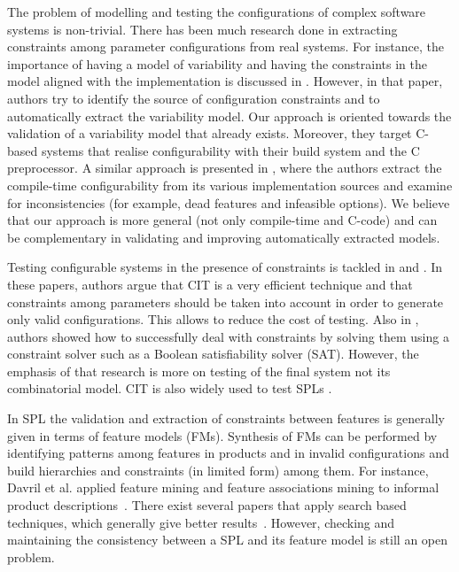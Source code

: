 \begin{tikzborder}{\cite{Gargantini16:validation}}
\begin{tikzborder}{\cite{gargantini_combinatorial_2017}}
The problem of modelling and testing the configurations of complex software systems is non-trivial. There has been much research done in extracting constraints among parameter configurations from real systems. %
For instance, the importance of having a model of variability and having the constraints in the model aligned with the implementation is discussed in \cite{NadiBKC14}. However, in that paper, authors try to identify the source of configuration constraints and to automatically extract the variability model. Our approach is oriented towards the validation of a variability model that already exists. Moreover, they target C-based systems that realise configurability with their build system and the C preprocessor. 
A similar approach is presented in \cite{Tartler:2011}, where the authors extract the compile-time configurability from its various implementation sources and examine for inconsistencies (for example, dead features and infeasible options). We believe that our approach is more general (not only compile-time and C-code) and can be complementary in validating and improving automatically extracted models.

Testing configurable systems in the presence of constraints is tackled in \cite{CohenTSE08} and \cite{Petke15:practical}. In these papers, authors argue that CIT is a very efficient technique and that constraints among parameters should be taken into account in order to generate only valid configurations. This allows to reduce the cost of testing. Also in \cite{jar10}, authors showed how to successfully deal with constraints by solving them using a constraint solver such as a Boolean satisfiability solver (SAT). However, the emphasis of that research is more on testing of the final system not its combinatorial model. CIT is also widely used to test SPLs \cite{Perrouin010a}.

In SPL the validation and extraction of constraints between features is generally given in terms of feature models (FMs). Synthesis of FMs can be performed by identifying patterns among features in products and in invalid configurations and build hierarchies and constraints (in limited form) among them. For instance, Davril et al. applied feature mining and feature associations mining to informal product descriptions~\cite{Davril13}. There exist several papers that apply search based techniques, which generally give better results~\cite{SBSEforSPLsurvey,LopezHerrejon201533,FerreiraVQ13,lopez-herrejon_reverse_2012}. However, checking and maintaining the consistency between a SPL and its feature model is still an open problem. 






\end{tikzborder}
\end{tikzborder}
